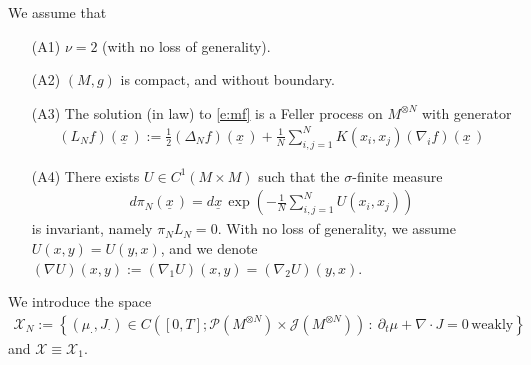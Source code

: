 \documentclass[reqno]{amsart}
\numberwithin{equation}{section}
\numberwithin{theorem}{section}
\newcommand{\mc}[1]{{\mathcal #1}}
\newcommand{\downbar}[1]{\underline{#1\!}\,}
\newcommand{\bel}[2]{\begin{equation} \label{#1} \begin{split} #2
 \end{split} \end{equation}}
\newcommand{\dangle}[2]{\langle #1,\,#2 \rangle}
\newcommand{\comment}[1]{
\par\noindent
\colorbox{light}{\begin{minipage}{120 mm}#1\end{minipage}}
\par\noindent
}
\newcommand{\undx}{\downbar{x}}
\newcommand{\visc}{\nu}
\begin{document}
We assume that
\begin{itemize}
\item[(A1)] $\visc=2$ (with no loss of generality).

\item[(A2)] $(M,g)$ is compact, and without boundary.

\item[(A3)] The solution (in law) to \eqref{e:mf} is a Feller process on $M^{\otimes N}$ with generator
\bel{e:gen}{
(L_N f)(\undx):= \tfrac{1}2 (\Delta_N f)(\undx) +\frac 1N \sum_{i,j=1}^N K(x_i,x_j) (\nabla_i f)(\undx)
}

\item[(A4)] There exists $U\in C^1(M\times M)$ such that the $\sigma$-finite measure
\bel{e:pin}{
d\pi_N(\undx)= d\undx \exp\left(- \tfrac{1}{N} \sum_{i,j=1}^N U(x_i,x_j)\right)
}
is invariant, namely $\pi_N L_N=0$. With no loss of generality, we assume $U(x,y)=U(y,x)$, and we denote $(\nabla U)(x,y):= (\nabla_1 U)(x,y)=(\nabla_2 U)(y,x)$.
\end{itemize}


We introduce the space
\bel{e:meascurr}{
\mc X_N:=\left\{(\mu_\cdot,J_\cdot)\in C\left([0,T];\mc P(M^{\otimes N})\times \mc J(M^{\otimes N})\right)\,:\: \partial_t\mu +\nabla \cdot J=0\,\text{weakly}
\right\}
}
and $\mc X\equiv \mc X_1$.
\end{document}

